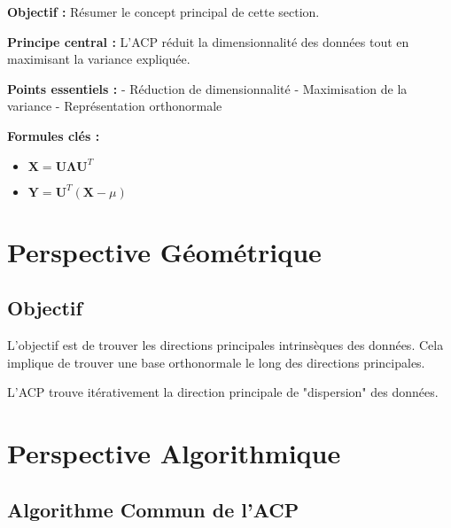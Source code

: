 \documentclass[12pt]{article}
\begin{document}
\begin{tcolorbox}[title={Fiche Récapitulative}]
\textbf{Objectif :} Résumer le concept principal de cette section.

\textbf{Principe central :} L'ACP réduit la dimensionnalité des données tout en maximisant la variance expliquée.

\vspace{0.4em}
\textbf{Points essentiels :}  
- Réduction de dimensionnalité
- Maximisation de la variance
- Représentation orthonormale

\vspace{0.4em}
\textbf{Formules clés :}  
\begin{itemize}
\item \(\mathbf{X} = \mathbf{U} \mathbf{\Lambda} \mathbf{U}^T\)
\item \(\mathbf{Y} = \mathbf{U}^T (\mathbf{X} - \mu)\)
\end{itemize}
\end{tcolorbox}

\newpage

\section{Perspective Géométrique}

\subsection{Objectif}

L'objectif est de trouver les directions principales intrinsèques des données. Cela implique de trouver une base orthonormale le long des directions principales.


\begin{tcolorbox}[title={Intuition}]
L'ACP trouve itérativement la direction principale de "dispersion" des données.
\end{tcolorbox}

\newpage

\section{Perspective Algorithmique}

\subsection{Algorithme Commun de l'ACP}
\end{document}
